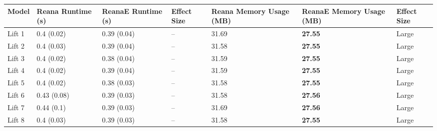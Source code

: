 \begin{tabular}{lllllll}
\toprule
  Model & Reana Runtime (s) & ReanaE Runtime (s) & Effect Size & Reana Memory Usage (MB) & ReanaE Memory Usage (MB) & Effect Size \\
\midrule
 Lift 1 &        0.4 (0.02) &        0.39 (0.04) &          -- &                   31.69 &           \textbf{27.55} &       Large \\
 Lift 2 &        0.4 (0.03) &        0.39 (0.04) &          -- &                   31.58 &           \textbf{27.55} &       Large \\
 Lift 3 &        0.4 (0.02) &        0.38 (0.04) &          -- &                   31.59 &           \textbf{27.55} &       Large \\
 Lift 4 &        0.4 (0.02) &        0.39 (0.04) &          -- &                   31.59 &           \textbf{27.55} &       Large \\
 Lift 5 &        0.4 (0.02) &        0.38 (0.03) &          -- &                   31.58 &           \textbf{27.55} &       Large \\
 Lift 6 &       0.43 (0.08) &        0.39 (0.03) &          -- &                   31.58 &           \textbf{27.56} &       Large \\
 Lift 7 &        0.44 (0.1) &        0.39 (0.03) &          -- &                   31.69 &           \textbf{27.56} &       Large \\
 Lift 8 &        0.4 (0.03) &        0.39 (0.03) &          -- &                   31.58 &           \textbf{27.55} &       Large \\
\bottomrule
\end{tabular}
